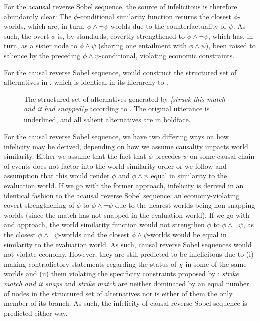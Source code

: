 For the acausal reverse Sobel sequence, the source of infelicitous is therefore abundantly clear: The $\phi$-conditional similarity function returns the closest $\phi$-worlds, which are, in turn, $\phi\land\neg\psi$-worlds due to the counterfactuality of $\psi$. As such, the overt $\phi$ is, by  standards, covertly strengthened to $\phi\land\neg\psi$, which has, in turn, as a sister node to $\phi\land\psi$ (sharing one entailment with $\phi\land\psi$), been raised to salience by the preceding $\phi\land\psi$-conditional, violating economic constraints.

For the causal reverse Sobel sequence, \textcite{Ippolito2020} would construct the structured set of alternatives in , which is identical in its hierarchy to .
\begin{figure}[!htb]
    \centering
    \resizebox{\linewidth}{!}{}
    \caption{The structured set of alternatives generated by \textit{[struck this match and it had snapped]\textsubscript{F}} according to \textcite{Ippolito2020}. The original utterance is underlined, and all salient alternatives are in boldface.}
\end{figure}
For the causal reverse Sobel sequence, we have two differing ways on how infelicity may be derived, depending on how we assume causality impacts world similarity. Either we assume that the fact that $\phi$ precedes $\psi$ on some causal chain of events does not factor into the world similarity order or we follow \textcite{Bennett2003} and  assumption that this would render $\phi$ and $\phi\land\psi$ equal in similarity to the evaluation world. If we go with the former approach, infelicity is derived in an identical fashion to the acausal reverse Sobel sequence: an economy-violating covert strengthening of $\phi$ to $\phi\land\neg\psi$ due to the nearest worlds being non-snapping worlds (since the match has not snapped in the evaluation world). If we go with \textcite{Bennett2003} and  approach, the world similarity function would not strengthen $\phi$ to $\phi\land\neg\psi$, as the closest $\phi\land\neg\psi$-worlds and the closest $\phi\land\psi$-worlds would be equal in similarity to the evaluation world. As such, causal reverse Sobel sequences would not violate economy. However, they are still predicted to be infelicitous due to (i) making contradictory statements regarding the status of $\chi$ in some of the same worlds and (ii) them violating the specificity constraints proposed by \textcite{Ippolito2020}: \textit{strike match and it snaps} and \textit{strike match} are neither dominated by an equal number of nodes in the structured set of alternatives nor is either of them the only member of its branch. As such, the infelicity of causal reverse Sobel sequence is predicted either way.

